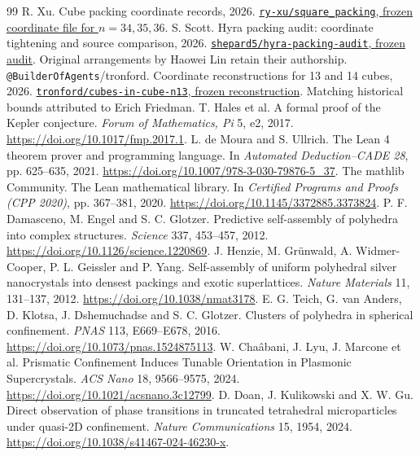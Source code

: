 \documentclass[11pt,a4paper]{article}
\newcommand{\code}[1]{\texttt{\nolinkurl{#1}}}
\begin{document}
\begin{thebibliography}{99}
 R. Xu. Cube packing coordinate records, 2026. \href{https://github.com/ry-xu/square_packing/blob/9535d65d84cc33f20f4e26329f8da12bdcef216e/cube_packing_records.json}{\code{ry-xu/square_packing}, frozen coordinate file for $n=34,35,36$}.
 S. Scott. Hyra packing audit: coordinate tightening and source comparison, 2026. \href{https://github.com/shepard5/hyra-packing-audit/tree/c107fda33c2f02df83e9d549fb839b4fd5a7bfbc}{\code{shepard5/hyra-packing-audit}, frozen audit}. Original arrangements by Haowei Lin retain their authorship.
 \code{@BuilderOfAgents}/tronford. Coordinate reconstructions for 13 and 14 cubes, 2026. \href{https://github.com/tronford/cubes-in-cube-n13/tree/1f0c75401b2da4850b7e9f14de7d7b9cbe5e461a}{\code{tronford/cubes-in-cube-n13}, frozen reconstruction}. Matching historical bounds attributed to Erich Friedman.
 T. Hales et al. A formal proof of the Kepler conjecture. \emph{Forum of Mathematics, Pi} 5, e2, 2017. \url{https://doi.org/10.1017/fmp.2017.1}.
 L. de Moura and S. Ullrich. The Lean 4 theorem prover and programming language. In \emph{Automated Deduction--CADE 28}, pp. 625--635, 2021. \url{https://doi.org/10.1007/978-3-030-79876-5_37}.
 The mathlib Community. The Lean mathematical library. In \emph{Certified Programs and Proofs (CPP 2020)}, pp. 367--381, 2020. \url{https://doi.org/10.1145/3372885.3373824}.
 P. F. Damasceno, M. Engel and S. C. Glotzer. Predictive self-assembly of polyhedra into complex structures. \emph{Science} 337, 453--457, 2012. \url{https://doi.org/10.1126/science.1220869}.
 J. Henzie, M. Gr\"unwald, A. Widmer-Cooper, P. L. Geissler and P. Yang. Self-assembly of uniform polyhedral silver nanocrystals into densest packings and exotic superlattices. \emph{Nature Materials} 11, 131--137, 2012. \url{https://doi.org/10.1038/nmat3178}.
 E. G. Teich, G. van Anders, D. Klotsa, J. Dshemuchadse and S. C. Glotzer. Clusters of polyhedra in spherical confinement. \emph{PNAS} 113, E669--E678, 2016. \url{https://doi.org/10.1073/pnas.1524875113}.
 W. Cha\^abani, J. Lyu, J. Marcone et al. Prismatic Confinement Induces Tunable Orientation in Plasmonic Supercrystals. \emph{ACS Nano} 18, 9566--9575, 2024. \url{https://doi.org/10.1021/acsnano.3c12799}.
 D. Doan, J. Kulikowski and X. W. Gu. Direct observation of phase transitions in truncated tetrahedral microparticles under quasi-2D confinement. \emph{Nature Communications} 15, 1954, 2024. \url{https://doi.org/10.1038/s41467-024-46230-x}.

\end{thebibliography}
\end{document}
